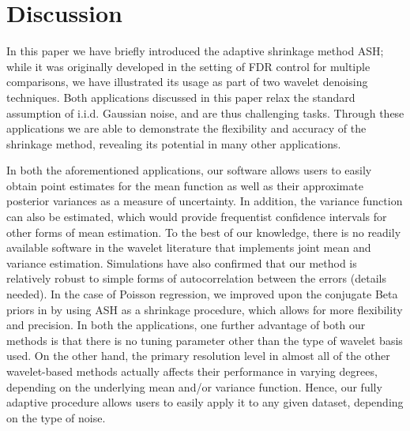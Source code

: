 \documentclass[12pt]{article}
\begin{document}
\section{Discussion}
In this paper we have briefly introduced the adaptive shrinkage method ASH; while it was originally developed in the setting of FDR control for multiple comparisons, we have illustrated its usage as part of two wavelet denoising techniques. Both applications discussed in this paper relax the standard assumption of i.i.d. Gaussian noise, and are thus challenging tasks. Through these applications we are able to demonstrate the flexibility and accuracy of the shrinkage method, revealing its potential in many other applications.

In both the aforementioned applications, our software allows users to easily obtain point estimates for the mean function as well as their approximate posterior variances as a measure of uncertainty. In addition, the variance function can also be estimated, which would provide frequentist confidence intervals for other forms of mean estimation. To the best of our knowledge, there is no readily available software in the wavelet literature that implements joint mean and variance estimation. Simulations have also confirmed that our method is relatively robust to simple forms of autocorrelation between the errors (details needed). In the case of Poisson regression, we improved upon the conjugate Beta priors in \cite{Kolaczyk1999Bayesian} by using ASH as a shrinkage procedure, which allows for more flexibility and precision. %
In both the applications, one further advantage of both our methods is that there is no tuning parameter other than the type of wavelet basis used. On the other hand, the primary resolution level in almost all of the other wavelet-based methods actually affects their performance in varying degrees, depending on the underlying mean and/or variance function. Hence, our fully adaptive procedure allows users to easily apply it to any given dataset, depending on the type of noise.
\end{document}
